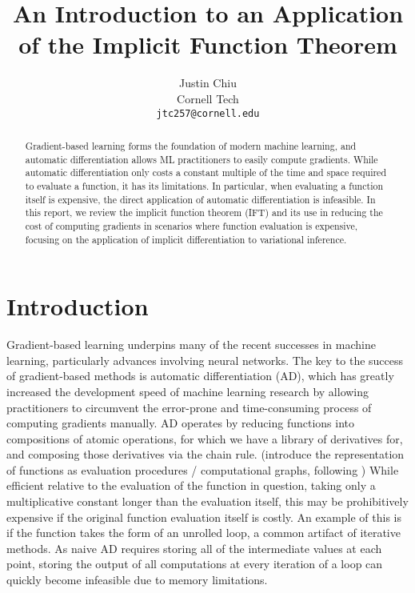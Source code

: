 \documentclass[11pt]{article}
\title{An Introduction to an Application of the Implicit Function Theorem}
\author{Justin Chiu \\
  Cornell Tech \\
  \texttt{jtc257@cornell.edu}}
\begin{document}
\maketitle
\begin{abstract}
Gradient-based learning forms the foundation of modern machine learning,
and automatic differentiation allows ML practitioners to easily compute gradients.
While automatic differentiation only costs a constant multiple of the time and space
required to evaluate a function, it has its limitations.
In particular, when evaluating a function itself is expensive,
the direct application of automatic differentiation is infeasible.
In this report, we review the implicit function theorem (IFT)
and its use in reducing the cost of computing gradients in scenarios where
function evaluation is expensive,
focusing on the application of implicit differentiation to variational inference.
\end{abstract}

\section{Introduction}
\label{sec:intro}
Gradient-based learning underpins many of the recent successes in machine learning,
particularly advances involving neural networks.
The key to the success of gradient-based methods is automatic differentiation (AD),
which has greatly increased the development speed of machine learning research by
allowing practitioners to circumvent the error-prone and time-consuming process
of computing gradients manually.
AD operates by reducing functions into compositions of atomic operations,
for which we have a library of derivatives for,
and composing those derivatives via the chain rule.
(introduce the representation of functions as evaluation procedures / computational graphs,
following \citet{griewank2008autodiff})
While efficient relative to the evaluation of the function in question,
taking only a multiplicative constant longer than the evaluation itself,
this may be prohibitively expensive if the original function evaluation itself is costly.
An example of this is if the function takes the form of an unrolled loop,
a common artifact of iterative methods.
As naive AD requires storing all of the intermediate values at each point,
storing the output of all computations at every iteration of a loop can quickly
become infeasible due to memory limitations.
\end{document}
